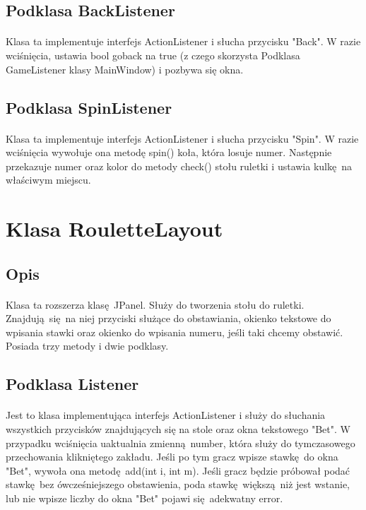 \documentclass[11pt,a4paper]{article}
\begin{document}
\subsection{Podklasa BackListener}
\paragraph{}
Klasa ta implementuje interfejs ActionListener i słucha przycisku "Back". W razie wciśnięcia, ustawia bool goback na true (z czego skorzysta Podklasa GameListener klasy MainWindow) i pozbywa się okna.
\subsection{Podklasa SpinListener}
\paragraph{}
Klasa ta implementuje interfejs ActionListener i słucha przycisku "Spin". W razie wciśnięcia wywołuje ona metodę spin() koła, która losuje numer. Następnie przekazuje numer oraz kolor do metody check() stołu ruletki i ustawia kulkę na właściwym miejscu.
\section{Klasa RouletteLayout}
\subsection{Opis}
\paragraph{}
Klasa ta rozszerza klasę JPanel. Służy do tworzenia stołu do ruletki. Znajdują się na niej przyciski służące do obstawiania, okienko tekstowe do wpisania stawki oraz okienko do wpisania numeru, jeśli taki chcemy obstawić. Posiada trzy metody i dwie podklasy.
\subsection{Podklasa Listener}
\paragraph{}
Jest to klasa implementująca interfejs ActionListener i służy do słuchania wszystkich przycisków znajdujących się na stole oraz okna tekstowego "Bet". W przypadku wciśnięcia uaktualnia zmienną number, która służy do tymczasowego przechowania klikniętego zakładu. Jeśli po tym gracz wpisze stawkę do okna "Bet", wywoła ona metodę add(int i, int m). Jeśli gracz będzie próbował podać stawkę bez ówcześniejszego obstawienia, poda stawkę większą niż jest wstanie, lub nie wpisze liczby do okna "Bet" pojawi się adekwatny error.
\end{document}
